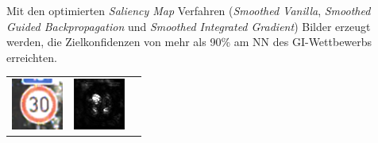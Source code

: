 Mit den optimierten \textit{Saliency Map} Verfahren (\textit{Smoothed Vanilla}, \textit{Smoothed Guided Backpropagation} und \textit{Smoothed Integrated Gradient}) Bilder erzeugt werden, die Zielkonfidenzen von mehr als 90\% am \ac{NN} des \ac{GI}-Wettbewerbs erreichten.

\begin{table}
	\centering
	\begin{tabular}{p{4.5cm}p{4.5cm}p{4.5cm}}
		\includegraphics[width=\linewidth]{Images/AnPe/5_1_Links} & \includegraphics[width=\linewidth]{Images/AnPe/5_1_Mitte} &

\end{tabular}
\end{table}
